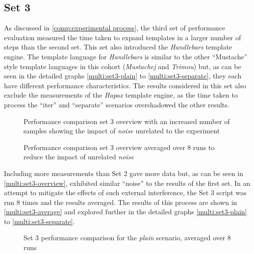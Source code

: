 \subsection{Set 3}
\label{comp:set 3}

As discussed in \autoref{comp:experimental process}, the third set of performance evaluation measured the time taken to expand templates in a larger number of steps than the second set. This set also introduced the \emph{Handlebars} \gls{template engine}. The \gls{template language} for \emph{Handlebars} is similar to the other \enquote{Mustache} style \gls{template language}s in this cohort (\emph{Mustachej} and \emph{Trimou}) but, as can be seen in the detailed graphs \autoref{multi:set3-plain} to \autoref{multi:set3-separate}, they each have different performance characteristics. The results considered in this set also exclude the measurements of the \emph{Hapax} \gls{template engine}, as the time taken to process the \enquote{iter} and \enquote{separate} scenarios  overshadowed the other results.

\begin{figure}[!p]
\centering

\caption{\label{multi:set3-overview}Performance comparison set 3 overview with an increased number of samples showing the impact of \emph{noise} unrelated to the experiment}
\end{figure}

\begin{figure}[!p]
\centering

\caption{\label{multi:set3-average}Performance comparison set 3 overview averaged over 8 runs to reduce the impact of unrelated \emph{noise}}
\end{figure}

Including more measurements than Set 2 gave more data but, as can be seen in \autoref{multi:set3-overview}, exhibited similar \enquote{noise} to the results of the first set. In an attempt to mitigate the effects of such external interference, the Set 3 script was run 8 times and the results averaged. The results of this process are shown in \autoref{multi:set3-average} and explored further in the detailed graphs \autoref{multi:set3-plain} to \autoref{multi:set3-separate}.

\begin{figure}[!p]
\centering

\caption{\label{multi:set3-plain}Set 3 performance comparison for the \emph{plain} scenario, averaged over 8 runs}
\end{figure}

